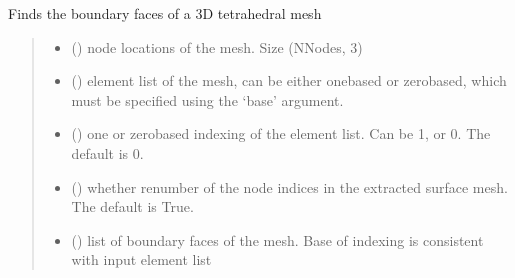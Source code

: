 \documentclass[letterpaper,10pt,english]{sphinxmanual}
\begin{document}
\begin{fulllineitems}
\label{\detokenize{_autosummary/nirfasterff.meshing.meshutils.boundfaces:nirfasterff.meshing.meshutils.boundfaces}}
\pysigstartsignatures
{}
\pysigstopsignatures
\sphinxAtStartPar
Finds the boundary faces of a 3D tetrahedral mesh
\begin{quote}\begin{description}
\begin{itemize}
\item {} 
\sphinxAtStartPar
{} () \textendash{} node locations of the mesh. Size (NNodes, 3)

\item {} 
\sphinxAtStartPar
{} () \textendash{} element list of the mesh, can be either one\sphinxhyphen{}based or zero\sphinxhyphen{}based, which must be specified using the ‘base’ argument.

\item {} 
\sphinxAtStartPar
{} (\sphinxstyleliteralemphasis{\sphinxupquote{, }}) \textendash{} one\sphinxhyphen{} or zero\sphinxhyphen{}based indexing of the element list. Can be 1, or 0. The default is 0.

\item {} 
\sphinxAtStartPar
{} (\sphinxstyleliteralemphasis{\sphinxupquote{, }}) \textendash{} whether renumber of the node indices in the extracted surface mesh. The default is True.

\end{itemize}

\sphinxAtStartPar
\begin{itemize}
\item {} 
\sphinxAtStartPar
{} () \textendash{} list of boundary faces of the mesh. Base of indexing is consistent with input element list


\end{itemize}
\end{description}
\end{quote}
\end{fulllineitems}
\end{document}
